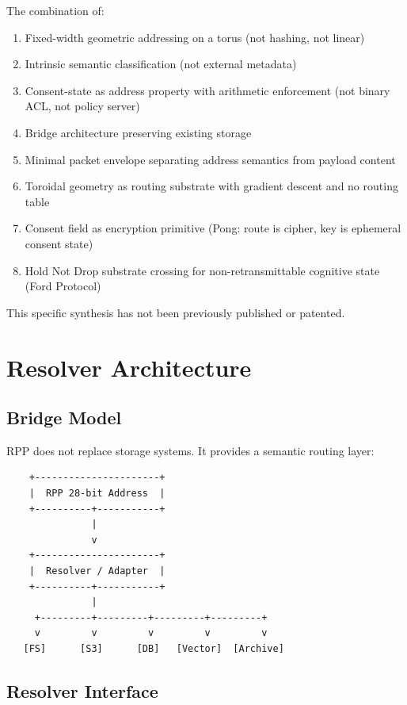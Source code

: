 \documentclass[11pt,a4paper]{article}
\begin{document}
The combination of:
\begin{enumerate}
    \item Fixed-width geometric addressing on a torus (not hashing, not linear)
    \item Intrinsic semantic classification (not external metadata)
    \item Consent-state as address property with arithmetic enforcement (not binary ACL, not policy server)
    \item Bridge architecture preserving existing storage
    \item Minimal packet envelope separating address semantics from payload content
    \item Toroidal geometry as routing substrate with gradient descent and no routing table
    \item Consent field as encryption primitive (Pong: route is cipher, key is ephemeral consent state)
    \item Hold Not Drop substrate crossing for non-retransmittable cognitive state (Ford Protocol)
\end{enumerate}

This specific synthesis has not been previously published or patented.

\section{Resolver Architecture}

\subsection{Bridge Model}

RPP does not replace storage systems. It provides a semantic routing layer:

\begin{verbatim}
    +----------------------+
    |  RPP 28-bit Address  |
    +----------+-----------+
               |
               v
    +----------------------+
    |  Resolver / Adapter  |
    +----------+-----------+
               |
     +---------+---------+---------+---------+
     v         v         v         v         v
   [FS]      [S3]      [DB]   [Vector]  [Archive]
\end{verbatim}

\subsection{Resolver Interface}
\end{document}
